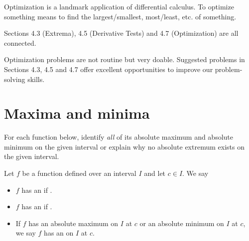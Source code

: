 \documentclass[../main.tex]{subfiles}
\begin{document}
 Optimization is a landmark application of differential calculus.  
To optimize something means to find the largest/smallest, most/least, etc. of something. 

Sections 4.3 (Extrema), 4.5 (Derivative Tests) and 4.7 (Optimization) are all connected.

\faExclamationTriangle{} Optimization problems are not routine but very doable. Suggested problems in Sections 4.3, 4.5 and 4.7 offer excellent opportunities to improve our problem-solving skills.

\section{Maxima and minima}

  \begin{example} \label{ex:abs-extrema}
    For each function below, identify \emph{all} of its absolute maximum and absolute minimum on the given interval or explain why no absolute extremum exists on the given interval.

    \begin{center}
      
      
      

      \vfill{}

      
      
      
    \end{center}
  \end{example}

  \begin{mdframed}[style=withref-compact]
    Let \(f\) be a function defined over an interval \(I\) and let \(c \in I\).  We say
    \begin{itemize}
      \item \(f\) has an  if \underline{\hspace{2.5in}}.

      \item \(f\) has an  if \underline{\hspace{2.5in}}.

      \item If \(f\) has an absolute maximum on \(I\) at \(c\) or an absolute minimum on \(I\) at \(c\), we say \(f\) has an  on \(I\) at \(c\).
    \end{itemize}
  \end{mdframed}
\end{document}
